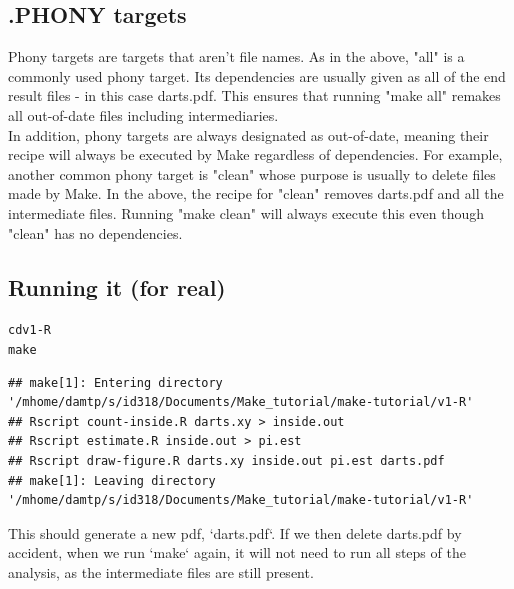 \documentclass[12pt]{article}\usepackage[]{graphicx}\usepackage[]{color}
\makeatletter
\newenvironment{kframe}{%
 \def\at@end@of@kframe{}%
 \ifinner\ifhmode%
  \def\at@end@of@kframe{\end{minipage}}%
  \begin{minipage}{\columnwidth}%
 \fi\fi%
 \def\FrameCommand##1{\hskip\@totalleftmargin \hskip-\fboxsep
 \colorbox{shadecolor}{##1}\hskip-\fboxsep
     \hskip-\linewidth \hskip-\@totalleftmargin \hskip\columnwidth}%
 \MakeFramed {\advance\hsize-\width
   \@totalleftmargin\z@ \linewidth\hsize
   \@setminipage}}%
 {\par\unskip\endMakeFramed%
 \at@end@of@kframe}
\newenvironment{knitrout}{}{} %
\makeatother
\begin{document}
\subsection{.PHONY targets}

Phony targets are targets that aren't file names. As in the above, "all" is a commonly used phony target. Its dependencies are usually given as all of the end result files - in this case darts.pdf. This ensures that running "make all" remakes all out-of-date files including intermediaries.\\

In addition, phony targets are always designated as out-of-date, meaning their recipe will always be executed by Make regardless of dependencies. For example, another common phony target is "clean" whose purpose is usually to delete files made by Make. In the above, the recipe for "clean" removes darts.pdf and all the intermediate files. Running "make clean" will always execute this even though "clean" has no dependencies.

\subsection{Running it (for real)}


\begin{knitrout}
\color{fgcolor}\begin{kframe}
\begin{alltt}
cd v1-R
make
\end{alltt}

\begin{verbatim}
## make[1]: Entering directory '/mhome/damtp/s/id318/Documents/Make_tutorial/make-tutorial/v1-R'
## Rscript count-inside.R darts.xy > inside.out
## Rscript estimate.R inside.out > pi.est
## Rscript draw-figure.R darts.xy inside.out pi.est darts.pdf
## make[1]: Leaving directory '/mhome/damtp/s/id318/Documents/Make_tutorial/make-tutorial/v1-R'
\end{verbatim}
\end{kframe}
\end{knitrout}

This should generate a new pdf, `darts.pdf`.  If we then delete
darts.pdf by accident, when we run `make` again, it will not need to
run all steps of the analysis, as the intermediate files are still
present.
\end{document}
